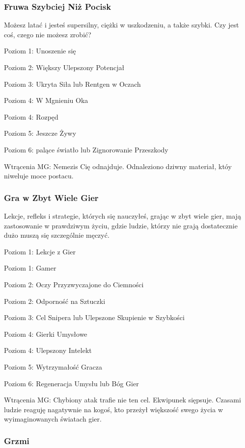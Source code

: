 \subsubsection{Fruwa Szybciej Niż Pocisk}

Możesz latać i jesteś supersilny, ciężki w uszkodzeniu, a także szybki. Czy jest coś, czego nie możesz zrobić?

Poziom 1: Unoszenie się

Poziom 2: Większy Ulepszony Potencjał

Poziom 3: Ukryta Siła lub Rentgen w Oczach

Poziom 4: W Mgnieniu Oka

Poziom 4: Rozpęd

Poziom 5: Jeszcze Żywy

Poziom 6: palące światło lub Zignorowanie Przeszkody

Wtrącenia MG: Nemezis Cię odnajduje. Odnaleziono dziwny materiał, któy niweluje moce postacu. 

\subsubsection{Gra w Zbyt Wiele Gier}

Lekcje, refleks i strategie, których się nauczyłeś, grając w zbyt wiele gier, mają zastosowanie w prawdziwym życiu, gdzie ludzie, którzy nie grają dostatecznie dużo muszą się szczególnie męczyć. 

Poziom 1: Lekcje z Gier

Poziom 1: Gamer

Poziom 2: Oczy Przyzwyczajone do Ciemności

Poziom 2: Odporność na Sztuczki

Poziom 3: Cel Snipera lub Ulepszone Skupienie w Szybkości

Poziom 4: Gierki Umysłowe

Poziom 4: Ulepszony Intelekt

Poziom 5: Wytrzymałość Gracza

Poziom 6: Regeneracja Umysłu lub Bóg Gier

Wtrącenia MG: Chybiony atak trafie nie ten cel. Ekwipunek siępsuje. Czasami ludzie reaguję nagatywnie na kogoś, kto przeżył większość swego życia w wyimaginowanych światach gier.

\subsubsection{Grzmi}

